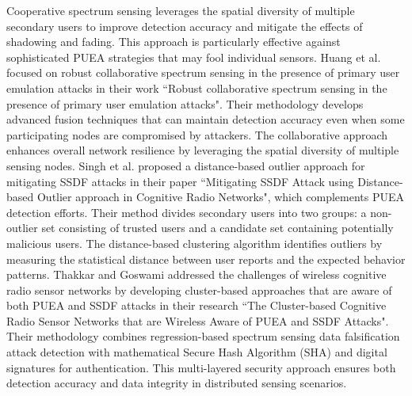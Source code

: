 Cooperative spectrum sensing leverages the spatial diversity of multiple secondary users to improve detection accuracy and mitigate the effects of shadowing and fading. This approach is particularly effective against sophisticated PUEA strategies that may fool individual sensors.
Huang et al. \cite{ref8} focused on robust collaborative spectrum sensing in the presence of primary user emulation attacks in their work ``Robust collaborative spectrum sensing in the presence of primary user emulation attacks". Their methodology develops advanced fusion techniques that can maintain detection accuracy even when some participating nodes are compromised by attackers. The collaborative approach enhances overall network resilience by leveraging the spatial diversity of multiple sensing nodes.
Singh et al. \cite{ref14} proposed a distance-based outlier approach for mitigating SSDF attacks in their paper ``Mitigating SSDF Attack using Distance-based Outlier approach in Cognitive Radio Networks", which complements PUEA detection efforts. Their method divides secondary users into two groups: a non-outlier set consisting of trusted users and a candidate set containing potentially malicious users. The distance-based clustering algorithm identifies outliers by measuring the statistical distance between user reports and the expected behavior patterns.
Thakkar and Goswami \cite{ref12} addressed the challenges of wireless cognitive radio sensor networks by developing cluster-based approaches that are aware of both PUEA and SSDF attacks in their research ``The Cluster-based Cognitive Radio Sensor Networks that are Wireless Aware of PUEA and SSDF Attacks". Their methodology combines regression-based spectrum sensing data falsification attack detection with mathematical Secure Hash Algorithm (SHA) and digital signatures for authentication. This multi-layered security approach ensures both detection accuracy and data integrity in distributed sensing scenarios.


